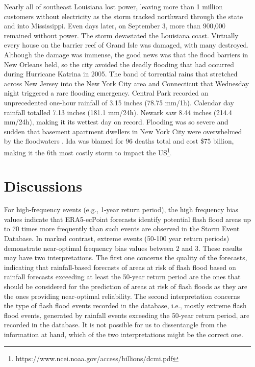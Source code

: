 Nearly  all of southeast Louisiana lost power, leaving more than 1 million customers without electricity as the storm tracked northward through the state and into Mississippi. Even days later, on September 3, more than 900,000 remained without power. The storm devastated the Louisiana coast. Virtually every house on the barrier reef of Grand Isle was damaged, with many destroyed. Although the damage was immense, the good news was that the flood barriers in New Orleans held, so the city avoided the deadly flooding that had occurred during Hurricane Katrina in 2005. The band of torrential rains that stretched across New Jersey into the New York City area and Connecticut that Wednesday night triggered a rare flooding emergency. Central Park recorded an unprecedented one-hour rainfall of 3.15 inches (78.75 mm/1h). Calendar day rainfall totalled 7.13 inches (181.1 mm/24h). Newark saw 8.44 inches (214.4 mm/24h), making it its wettest day on record. Flooding was so severe and sudden that basement apartment dwellers in New York City were overwhelmed by the floodwaters \citep{LeComte_2022}. Ida was blamed for 96 deaths total and cost \$75 billion, making it the 6th most costly storm to impact the US\footnote{https://www.ncei.noaa.gov/access/billions/dcmi.pdf}.





\section{Discussions}
\label{flash_flood_focused_verification_rainfall_based_ff_DISCUSSIONS}


For  high-frequency events (e.g., 1-year return period), the high frequency bias values indicate that ERA5-ecPoint forecasts identify potential flash flood areas up to 70 times more frequently than such events are observed in the Storm Event Database. In marked contrast, extreme events (50-100 year return periods) demonstrate near-optimal frequency bias values between 2 and 3. These results may have two interpretations. The first one concerns the quality of the forecasts, indicating that rainfall-based forecasts of areas at risk of flash flood based on rainfall forecasts exceeding at least the 50-year return period are the ones that should be considered for the prediction of areas at risk of flash floods as they are the ones providing near-optimal reliability. The second interpretation concerns the type of flash flood events recorded in the database, i.e., mostly extreme flash flood events, generated by rainfall events exceeding the 50-year return period, are recorded in the database. It is not possible for us to dissentangle from the information at hand, which of the two interpretations might be the correct one. 



